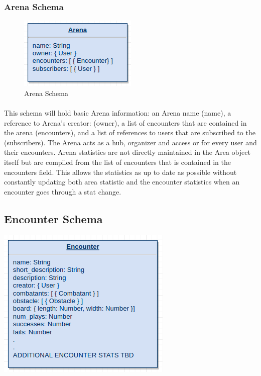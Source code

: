 \documentclass[12pt,a4paper]{report}
\begin{document}
		\subsubsection{Arena Schema}
		
			\begin{figure}[h]
				\centering
				\includegraphics[scale=.75]{schema-arena}
				\caption{Arena Schema}
				\label{fig: Arena Schema }
			\end{figure}
		
			\paragraph{}This schema will hold basic Arena information: an Arena name (name), a reference to Arena's creator: (owner), a list of encounters that are contained in the arena (encounters), and a list of references to users that are subscribed to the (subscribers). The Arena acts as a hub, organizer and access or for every user and their encounters. Arena statistics are not directly maintained in the Area object itself but are compiled from the list of encounters that is contained in the encounters field. This allows the statistics as up to date as possible without constantly updating both area statistic and the encounter statistics when an encounter goes through a stat change.
		
\subsection{Encounter Schema}
		
	\includegraphics[scale=.75]{schema-encounter}
\end{document}
